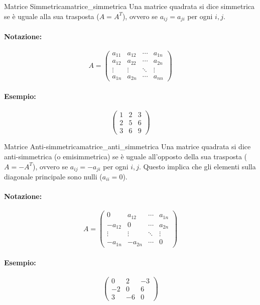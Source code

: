 \documentclass{article}
\begin{document}
\begin{definition}{Matrice Simmetrica}{matrice_simmetrica}
Una matrice quadrata si dice simmetrica se è uguale alla sua trasposta ($A = A^T$), ovvero se $a_{ij} = a_{ji}$ per ogni $i,j$.
\paragraph{Notazione:}
\[ A = \begin{pmatrix}
a_{11} & a_{12} & \cdots & a_{1n} \\
a_{12} & a_{22} & \cdots & a_{2n} \\
\vdots & \vdots & \ddots & \vdots \\
a_{1n} & a_{2n} & \cdots & a_{nn}
\end{pmatrix} \]
\paragraph{Esempio:}
\[ \begin{pmatrix}
1 & 2 & 3 \\
2 & 5 & 6 \\
3 & 6 & 9
\end{pmatrix} \]
\end{definition}

\begin{definition}{Matrice Anti-simmetrica}{matrice_anti_simmetrica}
Una matrice quadrata si dice anti-simmetrica (o emisimmetrica) se è uguale all'opposto della sua trasposta ($A = -A^T$), ovvero se $a_{ij} = -a_{ji}$ per ogni $i,j$. Questo implica che gli elementi sulla diagonale principale sono nulli ($a_{ii} = 0$).
\paragraph{Notazione:}
\[ A = \begin{pmatrix}
0 & a_{12} & \cdots & a_{1n} \\
-a_{12} & 0 & \cdots & a_{2n} \\
\vdots & \vdots & \ddots & \vdots \\
-a_{1n} & -a_{2n} & \cdots & 0
\end{pmatrix} \]
\paragraph{Esempio:}
\[ \begin{pmatrix}
0 & 2 & -3 \\
-2 & 0 & 6 \\
3 & -6 & 0
\end{pmatrix} \]
\end{definition}
\end{document}
